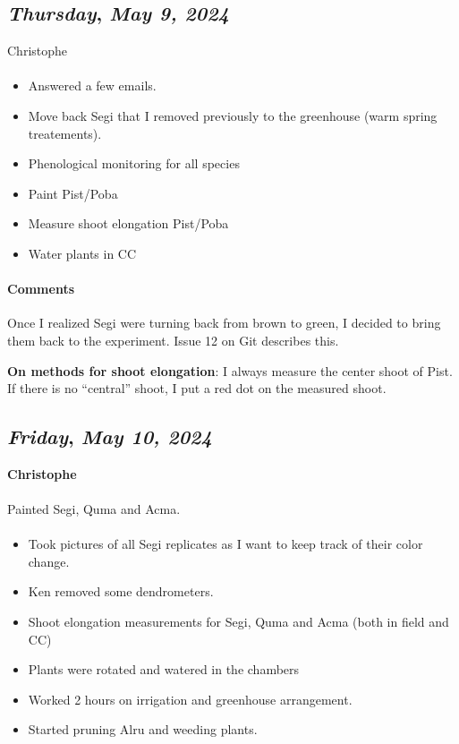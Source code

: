 \def\day{\textit{May 9, 2024}}
\def\weekday{\textit{Thursday}}
\subsection*{\weekday, \day}
Christophe
\paragraph{}
\begin{itemize}
    \item Answered a few emails.
    \item Move back Segi that I removed previously to the greenhouse (warm spring treatements).
    \item Phenological monitoring for all species
    \item Paint Pist/Poba
    \item Measure shoot elongation Pist/Poba
    \item Water plants in CC
\end{itemize}

\paragraph{Comments} Once I realized Segi were turning back from brown to green, I decided to bring them back to the experiment. Issue 12 on Git describes this.

\textbf{On methods for shoot elongation}: I always measure the center shoot of Pist. If there is no “central” shoot, I put a red dot on the measured shoot. 

\def\day{\textit{May 10, 2024}}
\def\weekday{\textit{Friday}}
\subsection*{\weekday, \day}
\textbf{Christophe}
\paragraph{}
Painted Segi, Quma and Acma.
\paragraph{}
\begin{itemize}
    \item Took pictures of all Segi replicates as I want to keep track of their color change.
    \item Ken removed some dendrometers.
    \item Shoot elongation measurements for Segi, Quma and Acma (both in field and CC)
    \item Plants were rotated and watered in the chambers
    \item Worked 2 hours on irrigation and greenhouse arrangement.
    \item Started pruning Alru and weeding plants.
\end{itemize}
